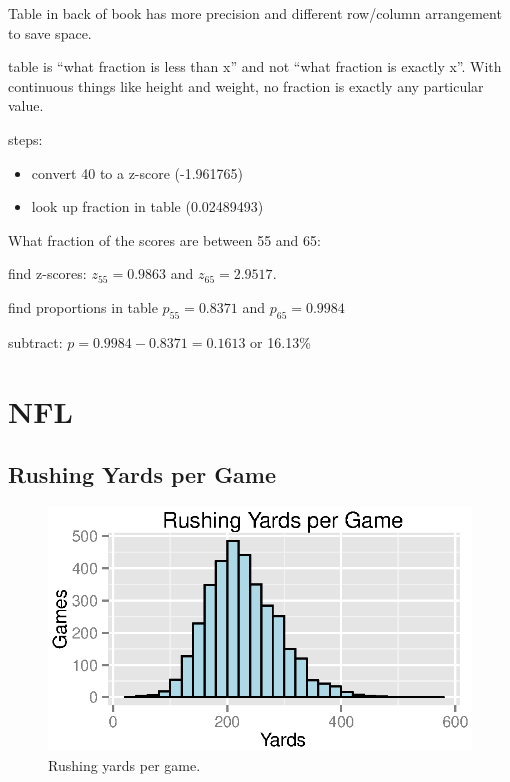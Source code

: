 \documentclass{exam}
\begin{document}
  \begin{itemize*}
    \item Table in back of book has more precision and different row/column
      arrangement to save space.
    \item table is ``what fraction is less than x'' and not ``what fraction is
      exactly x''.  With continuous things like height and weight, no fraction is
      exactly any particular value.
  \end{itemize*}

  steps:
  \begin{itemize}
    \item convert 40 to a z-score (-1.961765)
    \item look up fraction in table (0.02489493)
  \end{itemize}

  What fraction of the scores are between 55 and 65:
  \begin{itemize*}
    \item find z-scores: $z_{55} = 0.9863$ and $z_{65} = 2.9517$.
    \item find proportions in table $p_{55} = 0.8371$ and $p_{65} = 0.9984$
    \item subtract: $p = 0.9984 - 0.8371 = 0.1613$ or 16.13\%
  \end{itemize*}


  \section{NFL}

  \subsection{Rushing Yards per Game}

  \begin{figure}[H]
    \centering
    \includegraphics{figures/nfl/rush_yds_per_game.eps}
    \caption{Rushing yards per game.}
  \end{figure}
\end{document}
